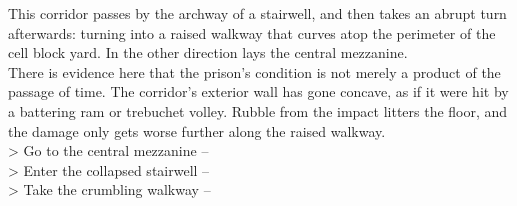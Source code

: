 This corridor passes by the archway of a stairwell, and then takes an abrupt turn afterwards: turning into a raised walkway that curves atop the perimeter of the cell block yard. In the other direction lays the central mezzanine.\\

There is evidence here that the prison’s condition is not merely a product of the passage of time. The corridor's exterior wall has gone concave, as if it were hit by a battering ram or trebuchet volley. Rubble from the impact litters the floor, and the damage only gets worse further along the raised walkway.\\

> Go to the central mezzanine -- \\
> Enter the collapsed stairwell -- \\
> Take the crumbling walkway -- 
